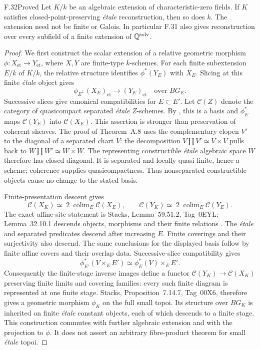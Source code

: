 \begin{claim}{F.32}{Proved}
Let $K/k$ be an algebraic extension of characteristic-zero fields.
If $K$ satisfies closed-point-preserving \emph{\'etale}
reconstruction, then so does $k$. The extension need not be
finite or Galois. In particular F.31 also gives reconstruction
over every subfield of a finite extension of $\mathbb Q^{\mathrm{solv}}$.
\end{claim}
\begin{proof}
We first construct the scalar extension of a relative geometric
morphism $\phi:X_{\mathrm{et}}\to Y_{\mathrm{et}}$, where $X,Y$
are finite-type $k$-schemes. For each finite subextension
$E/k$ of $K/k$, the relative structure identifies
$\phi^*(Y_E)$ with $X_E$. Slicing at this finite \emph{\'etale}
object gives
\[
 \phi_E:(X_E)_{\mathrm{et}}\longrightarrow(Y_E)_{\mathrm{et}}
 \quad\text{over }BG_E.
\]
Successive slices give canonical compatibilities for $E\subset E'$.
Let $\mathcal C(Z)$ denote the category of quasicompact separated
\emph{\'etale} $Z$-schemes. By \citet[Lemma~A.4,
Theorem~A.8 and Corollary~A.9]{F_CHW2024}, this is a basis
and $\phi_E^*$ maps $\mathcal C(Y_E)$ into $\mathcal C(X_E)$.
This assertion is stronger than preservation of coherent sheaves.
The proof of Theorem~A.8 uses the complementary clopen $V'$ to
the diagonal of a separated chart $V$: the decomposition
$V\amalg V'\simeq V\times V$ pulls back to
$W\amalg W'\simeq W\times W$. The representing constructible
\emph{\'etale} algebraic space $W$ therefore has closed diagonal.
It is separated and locally quasi-finite, hence a scheme;
coherence supplies quasicompactness. Thus nonseparated
constructible objects cause no change to the stated basis.

Finite-presentation descent gives
\[
 \mathcal C(X_K)\simeq\mathop{\mathrm{2\!\!\ colim}}_E
       \mathcal C(X_E),\qquad
 \mathcal C(Y_K)\simeq\mathop{\mathrm{2\!\!\ colim}}_E
       \mathcal C(Y_E).
\]
The exact affine-site statement is Stacks, Lemma~59.51.2,
Tag~0EYL; Lemma~32.10.1 descends objects, morphisms and their
finite relations \citep{F_StacksLimits}. The \emph{\'etale}
and separated predicates descend after increasing $E$.
Finite coverings and their surjectivity also descend.
The same conclusions for the displayed basis follow by finite
affine covers and their overlap data. Successive-slice
compatibility gives
\[
 \phi_{E'}^*(V\times_E E')\simeq\phi_E^*(V)\times_E E'.
\]
Consequently the finite-stage inverse images define a functor
$\mathcal C(Y_K)\to\mathcal C(X_K)$ preserving finite limits
and covering families: every such finite diagram is represented
at one finite stage. Stacks, Proposition~7.14.7, Tag~00X6,
therefore gives a geometric morphism $\phi_K$ on the full
small topoi. Its structure over $BG_K$ is inherited on finite
\emph{\'etale} constant objects, each of which descends to a
finite stage. This construction commutes with further algebraic
extension and with the projection to $\phi$. It does not assert
an arbitrary fibre-product theorem for small \emph{\'etale} topoi.


\end{proof}
